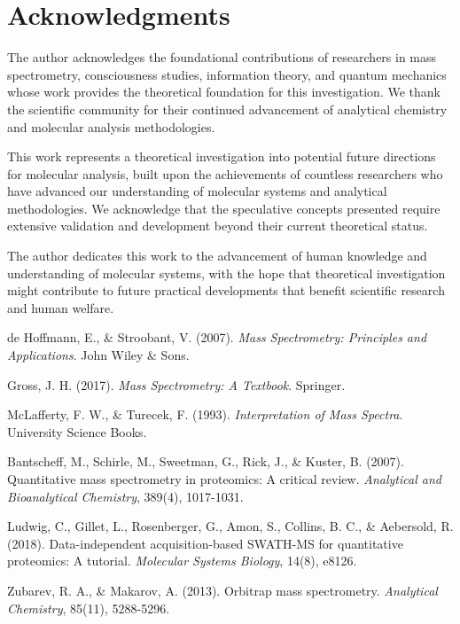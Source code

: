 \documentclass[11pt,a4paper]{article}
\theoremstyle{remark}
\begin{document}
{{{{{{{{{{\section*{Acknowledgments}

The author acknowledges the foundational contributions of researchers in mass spectrometry, consciousness studies, information theory, and quantum mechanics whose work provides the theoretical foundation for this investigation. We thank the scientific community for their continued advancement of analytical chemistry and molecular analysis methodologies.

This work represents a theoretical investigation into potential future directions for molecular analysis, built upon the achievements of countless researchers who have advanced our understanding of molecular systems and analytical methodologies. We acknowledge that the speculative concepts presented require extensive validation and development beyond their current theoretical status.

The author dedicates this work to the advancement of human knowledge and understanding of molecular systems, with the hope that theoretical investigation might contribute to future practical developments that benefit scientific research and human welfare.


\begin{thebibliography}{99}

de Hoffmann, E., \& Stroobant, V. (2007). \textit{Mass Spectrometry: Principles and Applications}. John Wiley \& Sons.

Gross, J. H. (2017). \textit{Mass Spectrometry: A Textbook}. Springer.

McLafferty, F. W., \& Turecek, F. (1993). \textit{Interpretation of Mass Spectra}. University Science Books.

Bantscheff, M., Schirle, M., Sweetman, G., Rick, J., \& Kuster, B. (2007). Quantitative mass spectrometry in proteomics: A critical review. \textit{Analytical and Bioanalytical Chemistry}, 389(4), 1017-1031.

Ludwig, C., Gillet, L., Rosenberger, G., Amon, S., Collins, B. C., \& Aebersold, R. (2018). Data-independent acquisition-based SWATH-MS for quantitative proteomics: A tutorial. \textit{Molecular Systems Biology}, 14(8), e8126.

Zubarev, R. A., \& Makarov, A. (2013). Orbitrap mass spectrometry. \textit{Analytical Chemistry}, 85(11), 5288-5296.


\end{thebibliography}}}}}}}}}}}
\end{document}

